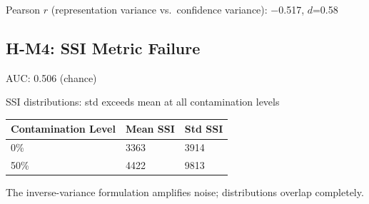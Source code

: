 Pearson $r$ (representation variance vs.\ confidence variance): $-$0.517, $d$=0.58

\subsection{H-M4: SSI Metric Failure}

AUC: 0.506 (chance)

SSI distributions: std exceeds mean at all contamination levels

\begin{table}[h]
\centering
\begin{tabular}{@{}lll@{}}
\toprule
Contamination Level & Mean SSI & Std SSI \\
\midrule
0\% & 3363 & 3914 \\
50\% & 4422 & 9813 \\
\bottomrule
\end{tabular}
\end{table}

The inverse-variance formulation amplifies noise; distributions overlap completely.
